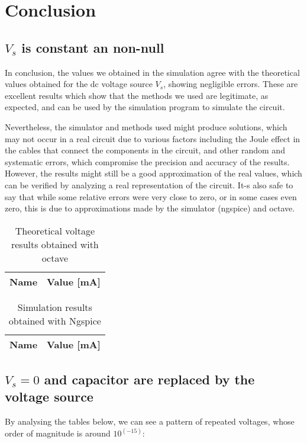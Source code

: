 \section{Conclusion}
\label{sec:conclusion}
\subsection{$V_s$ is constant an non-null}

	In conclusion, the values we obtained in the simulation agree with the theoretical values obtained for the dc voltage source $V_s$, showing negligible errors. These are excellent results which show that the methods we used are legitimate, as expected, and can be used by the simulation program to simulate the circuit.
	
Nevertheless, the simulator and methods used might produce solutions, which may not occur in a real circuit due to various factors including the Joule effect in the cables that connect the components in the circuit, and other random and systematic errors, which compromise the precision and accuracy of the results. However, the results might still be a good approximation of the real values, which can be verified by analyzing a real representation of the circuit. It-s also safe to say that while some relative errors were very close to zero, or in some cases even zero, this is due to approximations made by the simulator (ngspice) and octave.

\begin{table}[h!]
	\centering
	\begin{tabular}{|l|r|}
		\hline    
		{\bf Name} & {\bf Value [mA]} \\ \hline
		
	\end{tabular}
	\caption{Theoretical voltage results obtained with octave}
	\label{tab:op}
\end{table}

\begin{table}[h!]
	\centering
	\begin{tabular}{|l|r|}
		\hline    
		{\bf Name} & {\bf Value [mA]} \\ \hline
		
	\end{tabular}
	\caption{Simulation results obtained with Ngspice}
	\label{tab:op}
\end{table}

\subsection{$V_s = 0$ and capacitor are replaced by the voltage source}
By analysing the tables below, we can see a pattern of repeated voltages, whose order of magnitude is around $10^(-15)$:

